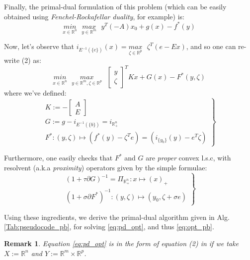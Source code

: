 \documentclass[a4paper,10pt,journal]{IEEEtran}
\newtheorem{remark}{Remark}
\begin{document}
Finally, the primal-dual formulation of this problem (which can be easily obtained using
\textit{Fenchel-Rockafellar duality}, for example) is:
\begin{equation}
  \underset{x \in \mathbb{R}^n}{min}\text{ }\underset{y \in \mathbb{R}^m}{max}\text{ }{y^T(-A)x_0 + g(x) - f^*(y)}
\end{equation}

Now, let's observe that $i_{E^{-1}(\{e\})}(x) = \underset{\zeta \in \mathbb{R}^p}{max}\text{ }\zeta^T(e - Ex)$, and so one can re-write (2) as:
\begin{equation}
  \underset{x \in \mathbb{R}^n}{min}\text{ }\underset{y \in \mathbb{R}^m, \zeta \in \mathbb{R}^p}{max}\text{ }
  \begin{bmatrix}y\\\zeta\end{bmatrix}^TKx + G(x) - F^*(y, \zeta)
  \label{eq:pd_opt}
\end{equation}
where we've defined:
\begin{equation}
  \left.
  \begin{aligned}
    K := -\begin{bmatrix}A\\E\end{bmatrix}\\
    G := g - i_{E^{-1}(\{b\})} = i_{\mathbb{R}_{+}^n}\\
    F^*: (y, \zeta) \mapsto (f^*(y) - \zeta^Te) = (i_{\{y_0\}}(y) - e^T\zeta)
  \end{aligned}
  \right\}
\end{equation}

Furthermore, one easily checks that $F^*$ and $G$ are \textit{proper} convex l.s.c, with resolvent
(a.k.a \textit{proximity}) operators given by the simple formulae:
\begin{equation}
  \left.
  \begin{aligned}
    (1 + \tau \partial G)^{-1} = \Pi_{\mathbb{R}_+^n}: x \mapsto (x)_+\\
    (1 + \sigma \partial F^*)^{-1}: (y, \zeta) \mapsto (y_0, \zeta + \sigma e)
  \end{aligned}
  \right\}
\end{equation}

Using these ingredients, we derive the primal-dual algorithm given in Alg.\ref{Tab:pseudocode_pb}, 
for solving \eqref{eq:pd_opt}, and thus \eqref{eq:opt_pb}.

\begin{remark}
Equation \eqref{eq:pd_opt} is in the form of equation (2) in \cite{chambolle2010} if we take $X := \mathbb{R}^n$ and
$Y := \mathbb{R}^m \times \mathbb{R}^p$.
\end{remark}
\end{document}

